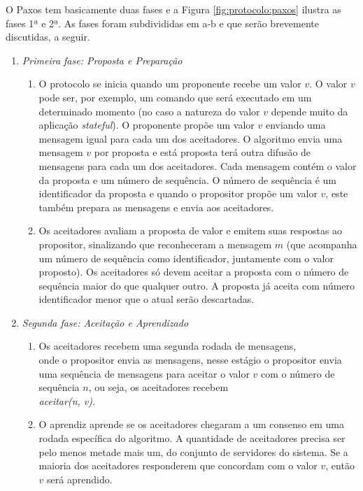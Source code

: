 O Paxos tem basicamente duas fases e a Figura \ref{fig:protocolo:paxos} ilustra as fases 1ª e 2ª. As fases foram subdivididas em a-b e que serão brevemente discutidas, a seguir.

\begin{enumerate}

\item \textit{Primeira fase: Proposta e Preparação}

\begin{enumerate}
\item O protocolo se inicia quando um proponente recebe um valor $v$. O valor $v$ pode ser, por exemplo, um comando que será executado em um determinado momento (no caso a natureza do valor $v$ depende muito da aplicação \textit{stateful}). O proponente propõe um valor $v$ enviando uma mensagem igual para cada um dos aceitadores. O algoritmo envia uma mensagem $v$ por proposta e está proposta terá outra difusão de mensagens para cada um dos aceitadores. Cada mensagem contém o valor da proposta e um número de sequência. O número de sequência é um identificador da proposta e quando o propositor propõe um valor $v$, este também prepara as mensagens e envia aos aceitadores.

\item Os aceitadores avaliam a proposta de valor e emitem suas respostas ao propositor, sinalizando que reconheceram a mensagem $m$ (que acompanha um número de sequência como identificador, juntamente com o valor proposto). Os aceitadores só devem aceitar a proposta com o número de sequência maior do que qualquer outro. A proposta já aceita com número identificador menor que o atual serão descartadas.
\end{enumerate}

\item \textit{Segunda fase: Aceitação e Aprendizado}

\begin{enumerate}

\item Os aceitadores recebem uma segunda rodada de mensagens,\\
onde o propositor
envia as mensagens, nesse estágio o propositor envia uma sequência de mensagens
para aceitar o valor $v$ com o número de sequência $n$, ou seja, os aceitadores 
recebem\\ \textit{aceitar(n, v)}.

\item O aprendiz aprende se os aceitadores chegaram a um consenso em uma rodada específica do algoritmo. A quantidade de aceitadores precisa ser pelo menos metade mais um, do conjunto de servidores do sistema. Se a maioria dos aceitadores responderem que concordam com o valor $v$, então $v$ será aprendido.
\end{enumerate}
\end{enumerate}

